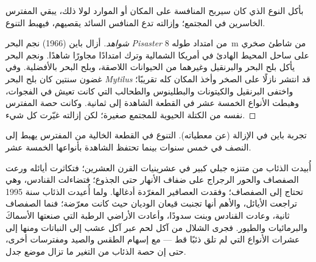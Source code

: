 \begin{proposition}\label{prop:b1:species-interactions:paine}
بأكل النوع الذي كان سيربح المنافسة على المكان أو الموارد لولا
ذلك، يبقي المفترس الخاسرين في المجتمع؛ وإزالته
تدع المنافس السائد يقصيهم، فيهبط التنوع.
\end{proposition}
\begin{proof}[شواهد]
أزال باين (1966) نجم البحر \emph{Pisaster} من امتداد طوله
\qty{8}{m} من شاطئ صخري على ساحل المحيط الهادئ في أمريكا
الشمالية وترك امتدادًا مجاورًا شاهدًا. ونجم البحر يأكل
بلح البحر والبرنقيل وغيرهما من الحيوانات اللاصقة، وبلح البحر بالأفضلية.
وفي غضون سنتين كان بلح البحر \emph{Mytilus} قد انتشر نازلًا على الصخر
وأخذ المكان كله تقريبًا؛ واختفى البرنقيل والكيتونات والبطلينوس
والطحالب التي كانت تعيش في الفجوات، وهبطت الأنواع الخمسة عشر
في القطعة الشاهدة إلى ثمانية. وكانت حصة المفترس نفسه من
الكتلة الحيوية للمجتمع صغيرة؛ لكن إزالته غيّرت كل شيء.
\end{proof}

\begin{omfigure}

{\small تجربة باين في الإزالة (عن معطياته). التنوع في
القطعة الخالية من المفترس يهبط إلى النصف في خمس سنوات بينما
تحتفظ الشاهدة بأنواعها الخمسة عشر.}
\end{omfigure}

\begin{example}\label{ex:b1:species-interactions:wolves}
أُبيدت الذئاب من متنزه جبلي كبير في عشرينيات القرن العشرين؛
فتكاثرت أيائله ورعت الصفصاف والحور الرجراج على ضفاف
الأنهار حتى الجذوع؛ فتضاءلت القنادس، وهي تحتاج إلى الصفصاف؛ وفقدت
العصافير المغرّدة أدغالها. ولما أُعيدت الذئاب سنة 1995 تراجعت
الأيائل، والأهم أنها تجنبت قيعان الوديان حيث كانت
معرّضة؛ فنما الصفصاف ثانية، وعادت القنادس وبنت سدودًا،
وأعادت الأراضي الرطبة التي صنعتها الأسماكَ والبرمائيات والطيور.
فجرى الشلال من آكل لحم عبر آكل عشب إلى النباتات
ومنها إلى عشرات الأنواع التي لم تلق ذئبًا قط --- مع إسهام
الطقس والصيد ومفترسات أخرى، حتى إن حصة الذئاب من التغير
ما تزال موضع جدل.
\end{example}

